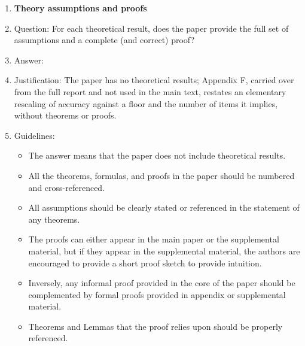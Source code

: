 \begin{enumerate}
\item {\bf Theory assumptions and proofs}
    \item[] Question: For each theoretical result, does the paper provide the full set of assumptions and a complete (and correct) proof?
    \item[] Answer: \answerNA{}
    \item[] Justification: The paper has no theoretical results; Appendix F, carried over from the full report and not used in the main text, restates an elementary rescaling of accuracy against a floor and the number of items it implies, without theorems or proofs.
    \item[] Guidelines:
    \begin{itemize}
        \item The answer \answerNA{} means that the paper does not include theoretical results. 
        \item All the theorems, formulas, and proofs in the paper should be numbered and cross-referenced.
        \item All assumptions should be clearly stated or referenced in the statement of any theorems.
        \item The proofs can either appear in the main paper or the supplemental material, but if they appear in the supplemental material, the authors are encouraged to provide a short proof sketch to provide intuition. 
        \item Inversely, any informal proof provided in the core of the paper should be complemented by formal proofs provided in appendix or supplemental material.
        \item Theorems and Lemmas that the proof relies upon should be properly referenced. 
    \end{itemize}


\end{enumerate}
